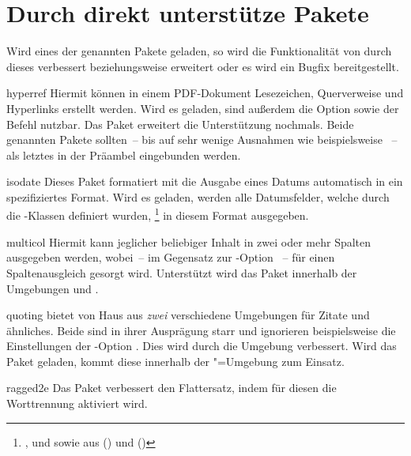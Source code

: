 \section{Durch \TUDScript direkt unterstütze Pakete}
%
Wird eines der genannten Pakete geladen, so wird die Funktionalität von 
\TUDScript durch dieses verbessert beziehungsweise erweitert oder es wird ein 
Bugfix bereitgestellt.
%
\begin{packages}
\item[hyperref]%
  Hiermit können in einem PDF-Dokument Lesezeichen, Querverweise und 
  Hyperlinks erstellt werden. Wird es geladen, sind außerdem die Option 
   sowie der Befehl  nutzbar. Das 
  Paket  erweitert die Unterstützung nochmals. Beide 
  genannten Pakete sollten~-- bis auf sehr wenige Ausnahmen wie beispielsweise 
  ~-- als letztes in der Präambel eingebunden werden.
\item[isodate]%
  Dieses Paket formatiert mit  die Ausgabe 
  eines Datums automatisch in ein spezifiziertes Format. Wird es geladen, 
  werden alle Datumsfelder, welche durch die \TUDScript-Klassen definiert 
  wurden,%
  \footnote{%
    ,  und  sowie aus 
     () und 
    ()
  }
  in diesem Format ausgegeben.
\item[multicol]%
  Hiermit kann jeglicher beliebiger Inhalt in zwei oder mehr Spalten ausgegeben 
  werden, wobei~-- im Gegensatz zur \KOMAScript-Option ~-- 
  für einen Spaltenausgleich gesorgt wird. Unterstützt wird das Paket innerhalb 
  der Umgebungen  und .
\item[quoting]%
   bietet von Haus aus \emph{zwei} verschiedene Umgebungen für 
  Zitate und ähnliches. Beide sind in ihrer Ausprägung starr und ignorieren 
  beispielsweise die Einstellungen der \KOMAScript-Option . 
  Dies wird durch die Umgebung  verbessert. Wird das Paket 
  geladen, kommt diese innerhalb der "=Umgebung zum 
  Einsatz.
\item[ragged2e]%
  Das Paket verbessert den Flattersatz, indem für diesen die Worttrennung 
  aktiviert wird.
\end{packages}



